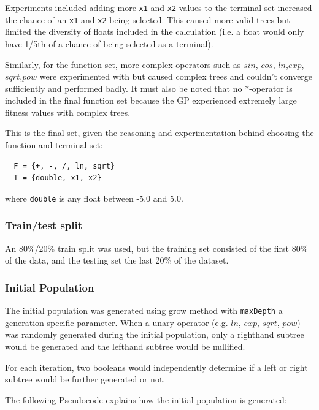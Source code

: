\documentclass{article}
\begin{document}
Experiments included adding more \texttt{x1} and \texttt{x2} values to the terminal set increased the chance of an \texttt{x1} and \texttt{x2} being selected. This caused more valid trees but limited the diversity of floats included in the calculation (i.e. a float would only have 1/5th of a chance of being selected as a terminal).

Similarly, for the function set, more complex operators such as \(sin\), \(cos\), \(ln\),\(exp\),\(sqrt\),\(pow\) were experimented with but caused complex trees and couldn't converge sufficiently and performed badly. It must also be noted that no \(*\)-operator is included in the final function set because the GP experienced extremely large fitness values with complex trees.

This is the final set, given the reasoning and experimentation behind choosing the function and terminal set:
\begin{verbatim}
  F = {+, -, /, ln, sqrt}
  T = {double, x1, x2}
\end{verbatim}
where \texttt{double} is any float between -5.0 and 5.0.

\subsubsection{Train/test split}
An 80\%/20\% train split was used, but the training set consisted of the first 80\% of the data, and the testing set the last 20\% of the dataset.

\subsubsection{Initial Population}
The initial population was generated using grow method with \texttt{maxDepth} a generation-specific parameter. When a unary operator (e.g. \(ln\), \(exp\), \(sqrt\), \(pow\)) was randomly generated during the initial population, only a righthand subtree would be generated and the lefthand subtree would be nullified.

For each iteration, two booleans would independently determine if a left or right subtree would be further generated or not.

The following Pseudocode explains how the initial population is generated:
\end{document}
